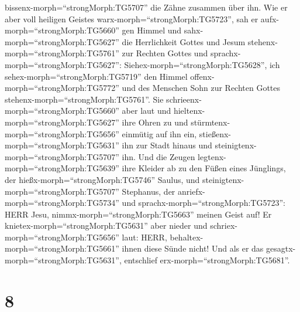 bissenx-morph=``strongMorph:TG5707'' die Zähne zusammen über ihn.
 Wie er aber voll heiligen Geistes
warx-morph=``strongMorph:TG5723'', sah er
aufx-morph=``strongMorph:TG5660'' gen Himmel und
sahx-morph=``strongMorph:TG5627'' die Herrlichkeit Gottes und Jesum
stehenx-morph=``strongMorph:TG5761'' zur Rechten Gottes 
und sprachx-morph=``strongMorph:TG5627'':
Siehex-morph=``strongMorph:TG5628'', ich
sehex-morph=``strongMorph:TG5719'' den Himmel
offenx-morph=``strongMorph:TG5772'' und des Menschen Sohn zur Rechten
Gottes stehenx-morph=``strongMorph:TG5761''.  Sie
schrieenx-morph=``strongMorph:TG5660'' aber laut und
hieltenx-morph=``strongMorph:TG5627'' ihre Ohren zu und
stürmtenx-morph=``strongMorph:TG5656'' einmütig auf ihn ein,
stießenx-morph=``strongMorph:TG5631'' ihn zur Stadt hinaus und
steinigtenx-morph=``strongMorph:TG5707'' ihn.  Und die
Zeugen legtenx-morph=``strongMorph:TG5639'' ihre Kleider ab zu den Füßen
eines Jünglings, der hießx-morph=``strongMorph:TG5746'' Saulus,
 und steinigtenx-morph=``strongMorph:TG5707'' Stephanus,
der anriefx-morph=``strongMorph:TG5734'' und
sprachx-morph=``strongMorph:TG5723'': HERR Jesu,
nimmx-morph=``strongMorph:TG5663'' meinen Geist auf!  Er
knietex-morph=``strongMorph:TG5631'' aber nieder und
schriex-morph=``strongMorph:TG5656'' laut: HERR,
behaltex-morph=``strongMorph:TG5661'' ihnen diese Sünde nicht! Und als
er das gesagtx-morph=``strongMorph:TG5631'', entschlief
erx-morph=``strongMorph:TG5681''.

\hypertarget{section-7}{%
\section{8}\label{section-7}}

